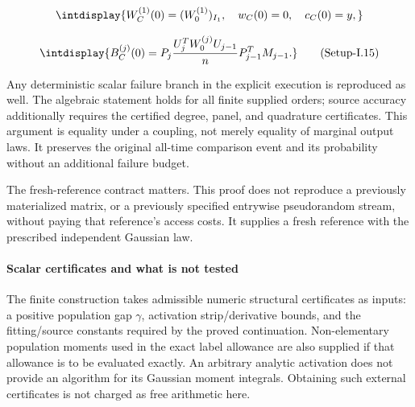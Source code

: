 \begingroup\renewcommand{\theHequation}{intdisplay.1097}
\begin{equation*}
\intdisplay{
W_C^{(1)}(0)=(W_0^{(1)})_{I_1},\quad w_C(0)=0,\quad c_C(0)=y,
}
\end{equation*}
\endgroup

\label{int:eq-setup-i-15}
\begingroup\renewcommand{\theHequation}{intdisplay.1098}
\begin{equation}
\intdisplay{
B_C^{(j)}(0)
=P_j\frac{U_j^TW_0^{(j)}U_{j-1}}nP_{j-1}^TM_{j-1}.
}
\tag{Setup-I.15}
\label{int:eq-0583-setup-i-15}
\end{equation}
\endgroup


Any deterministic scalar failure branch in the explicit execution is reproduced as well. The algebraic statement holds for all finite supplied orders; source accuracy additionally requires the certified degree, panel, and quadrature certificates. This argument is equality under a coupling, not merely equality of marginal output laws. It preserves the original all-time comparison event and its probability without an additional failure budget.



The fresh-reference contract matters. This proof does not reproduce a previously materialized matrix, or a previously specified entrywise pseudorandom stream, without paying that reference's access costs. It supplies a fresh reference with the prescribed independent Gaussian law.


\paragraph{Scalar certificates and what is not tested}
\label{int:setup-implicit-4}
\mbox{}\par\smallskip


The finite construction takes admissible numeric structural certificates as inputs: a positive population gap \(\gamma\), activation strip/derivative bounds, and the fitting/source constants required by the proved continuation. Non-elementary population moments used in the exact label allowance are also supplied if that allowance is to be evaluated exactly. An arbitrary analytic activation does not provide an algorithm for its Gaussian moment integrals. Obtaining such external certificates is not charged as free arithmetic here.


